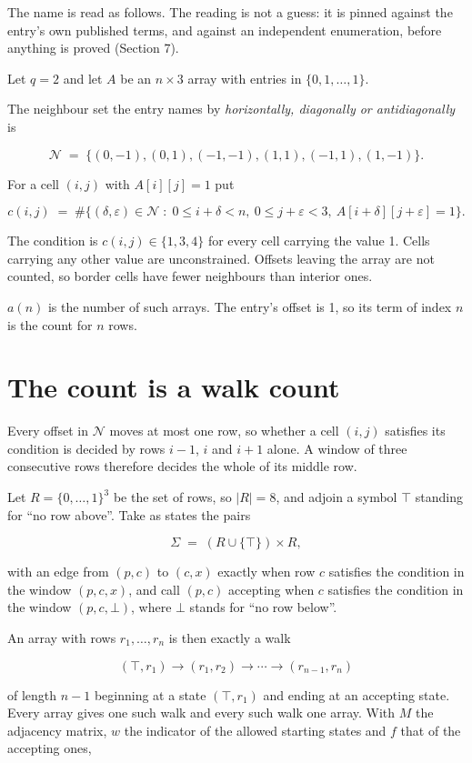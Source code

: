 \documentclass[11pt]{article}
\theoremstyle{definition}
\begin{document}
The name is read as follows. The reading is not a guess: it is pinned against the entry's own published terms, and against an independent enumeration, before anything is proved (Section 7).

Let $q = 2$ and let $A$ be an $n \times 3$ array with entries in $\{0,1,\dots,1\}$.

The neighbour set the entry names by {\itshape horizontally, diagonally or antidiagonally} is

\[\mathcal{N} \;=\; \{(0,-1), (0,1), (-1,-1), (1,1), (-1,1), (1,-1)\}.\]

For a cell $(i,j)$ with $A[i][j] = 1$ put

\[c(i,j) \;=\; \#\bigl\{(\delta,\varepsilon)\in\mathcal{N} \;:\; 0\le i+\delta<n,\ 0\le j+\varepsilon<3,\ A[i+\delta][j+\varepsilon] = 1\bigr\}.\]

The condition is $c(i,j) \in \{1, 3, 4\}$ for every cell carrying the value 1. Cells carrying any other value are unconstrained. Offsets leaving the array are not counted, so border cells have fewer neighbours than interior ones.

$a(n)$ is the number of such arrays. The entry's offset is 1, so its term of index $n$ is the count for $n$ rows.

\section{The count is a walk count}

Every offset in $\mathcal{N}$ moves at most one row, so whether a cell $(i,j)$ satisfies its condition is decided by rows $i-1$, $i$ and $i+1$ alone. A window of three consecutive rows therefore decides the whole of its middle row.

Let $R = \{0,\dots,1\}^{3}$ be the set of rows, so $|R| = 8$, and adjoin a symbol $\top$ standing for ``no row above''. Take as states the pairs

\[\Sigma \;=\; (R \cup \{\top\}) \times R,\]

with an edge from $(p,c)$ to $(c,x)$ exactly when row $c$ satisfies the condition in the window $(p,c,x)$, and call $(p,c)$ accepting when $c$ satisfies the condition in the window $(p,c,\bot)$, where $\bot$ stands for ``no row below''.

An array with rows $r_1,\dots,r_n$ is then exactly a walk

\[(\top,r_1) \to (r_1,r_2) \to \cdots \to (r_{n-1},r_n)\]

of length $n-1$ beginning at a state $(\top,r_1)$ and ending at an accepting state. Every array gives one such walk and every such walk one array. With $M$ the adjacency matrix, $w$ the indicator of the allowed starting states and $f$ that of the accepting ones,
\end{document}
